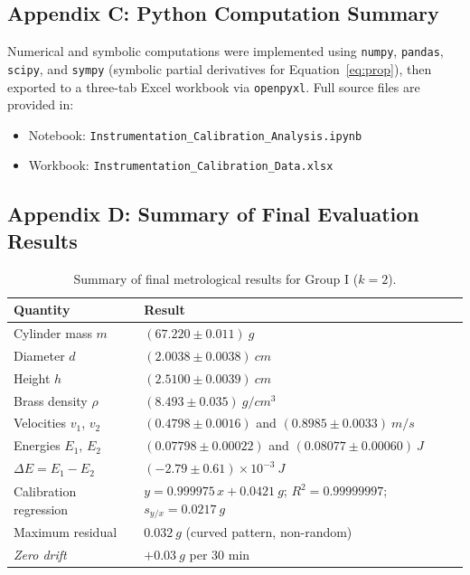\documentclass[a4paper, 12pt]{article}
\begin{document}
    \subsection*{Appendix C: Python Computation Summary}
    \noindent Numerical and symbolic computations were implemented using \texttt{numpy}, \texttt{pandas}, \texttt{scipy}, and \texttt{sympy} (symbolic partial derivatives for Equation~\eqref{eq:prop}), then exported to a three-tab Excel workbook via \texttt{openpyxl}. Full source files are provided in:
    \begin{itemize}
        \item Notebook: \texttt{Instrumentation\_Calibration\_Analysis.ipynb}
        \item Workbook: \texttt{Instrumentation\_Calibration\_Data.xlsx}
    \end{itemize}

    \subsection*{Appendix D: Summary of Final Evaluation Results}
    \begin{table}[H]
    \centering
    \singlespacing
    \caption{Summary of final metrological results for Group I ($k=2$).}
    \label{tab:ringkas}
    \small
    \begin{tabularx}{\textwidth}{@{}l X@{}}
    \toprule
    \textbf{Quantity} & \textbf{Result}\\
    \midrule
    Cylinder mass $m$ & $(67.220\pm0.011)\ \si{g}$\\
    Diameter $d$ & $(2.0038\pm0.0038)\ \si{cm}$\\
    Height $h$ & $(2.5100\pm0.0039)\ \si{cm}$\\
    Brass density $\rho$ & $(8.493\pm0.035)\ \si{g/cm^3}$\\
    Velocities $v_1$, $v_2$ & $(0.4798\pm0.0016)$ and $(0.8985\pm0.0033)\ \si{m/s}$\\
    Energies $E_1$, $E_2$ & $(0.07798\pm0.00022)$ and $(0.08077\pm0.00060)\ \si{J}$\\
    $\Delta E=E_1-E_2$ & $(-2.79\pm0.61)\times10^{-3}\ \si{J}$\\
    Calibration regression & $y=0.999975\,x+0.0421\ \si{g}$; $R^2=0.99999997$; $s_{y/x}=\SI{0.0217}{g}$\\
    Maximum residual & $\SI{0.032}{g}$ (curved pattern, non-random)\\
    \textit{Zero drift} & $+\SI{0.03}{g}$ per $30$ min\\
    \bottomrule
    \end{tabularx}
    \end{table}
\end{document}
